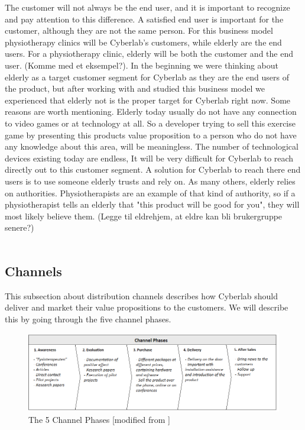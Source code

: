 The customer will not always be the end user, and it is important to recognize and pay attention to this difference. A satisfied end user is important for the customer, although they are not the same person. For this business model physiotherapy clinics will be Cyberlab's customers, while elderly are the end users. For a physiotherapy clinic, elderly will be both the customer and the end user. (Komme med et eksempel?). In the beginning we were thinking about elderly as a target customer segment for Cyberlab as they are the end users of the product, but after working with and studied this business model we experienced that elderly not is the proper target for Cyberlab right now. Some reasons are worth mentioning. Elderly today usually do not have any connection to video games or at technology at all. So a developer trying to sell this exercise game by presenting this products value proposition to a person who do not have any knowledge about this area, will be meaningless. The number of technological devices existing today are endless, It will be very difficult for Cyberlab to reach directly out to this customer segment. A solution for Cyberlab to reach there end users is to use someone elderly trusts and rely on. As many others, elderly relies on authorities. Physiotherapists are an example of that kind of authority, so if a physiotherapist tells an elderly that "this product will be good for you", they will most likely believe them. (Legge til eldrehjem, at eldre kan bli brukergruppe senere?) \\ \\ 
\subsection{Channels}
This subsection about distribution channels describes how Cyberlab should deliver and market their value propositions to the customers. We will describe this by going through the five channel phases.
\begin{figure}
\label{fig:Channels}
\begin{center}
\includegraphics[angle=90,scale=0.7]{channels}
\caption[Channels]{The 5 Channel Phases [modified from \cite{osterwalder}\cite{osterwalderthesis}]}
\end{center}
\end{figure}

